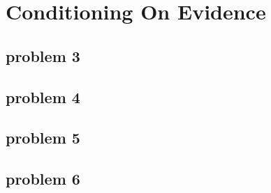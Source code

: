 \section{Conditioning On Evidence}

\subsection{problem 3}


\subsection{problem 4}


\subsection{problem 5}


\subsection{problem 6}
